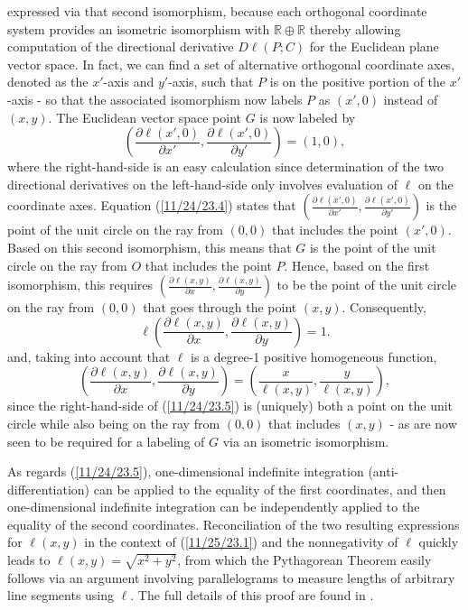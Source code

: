 \documentclass{amsart}
\numberwithin{equation}{section}
\theoremstyle{definition}
\numberwithin{theorem}{section}
\begin{document}
expressed via that second isomorphism, because each orthogonal coordinate system provides an isometric isomorphism with $\mathbb{R}\oplus\mathbb{R}$ thereby allowing computation of the directional derivative $D\ell(P;C)$ for the Euclidean plane vector space.  In fact, we can find a set of alternative orthogonal coordinate axes, denoted as the $x'$-axis and $y'$-axis, such that $P$ is on the positive portion of the $x'$-axis - so that the associated isomorphism now labels $P$ as $(x',0)$ instead of $(x,y)$.  The Euclidean vector space point $G$ is now labeled by  
 \begin{equation}\label{11/24/23.4} \left( \frac{\partial \ell(x',0)}{\partial x'}, \frac{\partial \ell(x',0)}{\partial y'}\right) = (1,0),\end{equation} where the right-hand-side is an easy calculation since determination of the two directional derivatives on the left-hand-side only involves evaluation of $\ell$ on the coordinate axes.  Equation (\ref{11/24/23.4}) states that $ \left( \frac{\partial \ell(x',0)}{\partial x'}, \frac{\partial \ell(x',0)}{\partial y'}\right)$ is the point of the unit circle on the ray from $(0,0)$ that includes the point $(x',0)$.
 Based on this second isomorphism, this means that $G$ is the point of the unit circle on the ray from $O$ that includes the point $P$.  Hence, based on the first isomorphism, this requires $\left( \frac{\partial \ell(x,y)}{\partial x}, \frac{\partial \ell(x,y)}{\partial y}\right)$ to be the point of the unit circle on the ray from $(0,0)$ that goes through the point $(x,y)$. Consequently, \begin{equation}\label{11/25/23.1} \ell\left( \frac{\partial \ell(x,y)}{\partial x}, \frac{\partial \ell(x,y)}{\partial y}\right) = 1.\end{equation} and, taking into account that $\ell$ is a degree-1 positive homogeneous function,  \begin{equation}\label{11/24/23.5} \left( \frac{\partial \ell(x,y)}{\partial x}, \frac{\partial \ell(x,y)}{\partial y}\right) = \left( \frac{x}{\ell(x,y)},  \frac{y}{\ell(x,y)}\right),\end{equation} since the right-hand-side of (\ref{11/24/23.5}) is (uniquely) both a point on the unit circle while also being on the ray from $(0,0)$ that includes $(x,y)$ - as are now seen to be required for a labeling of $G$ via an isometric isomorphism. 
 
  As regards (\ref{11/24/23.5}), one-dimensional indefinite integration (anti-differentiation) can be applied to the equality of the first coordinates, and then one-dimensional indefinite integration can be independently applied to the equality of the second coordinates.  Reconciliation of the  two resulting expressions for $\ell(x,y)$ in the context of (\ref{11/25/23.1}) and the nonnegativity of $\ell$ quickly leads to $\ell(x,y)=\sqrt{x^2+y^2}$, from which the Pythagorean Theorem easily follows via an argument involving parallelograms to measure lengths of arbitrary line segments using $\ell$. 
   The full details of this proof are found in \cite{fgreensite:2022b}.
\end{document}
